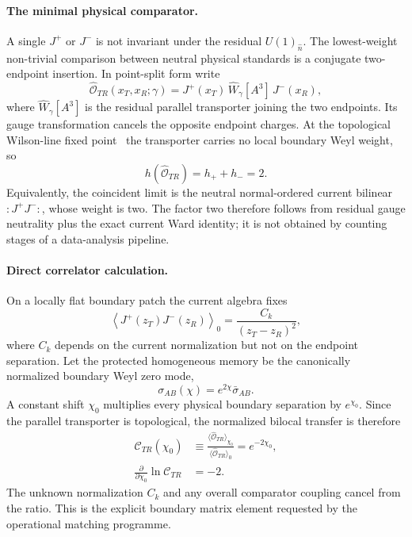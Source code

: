 \documentclass[aps,prd,twocolumn,10pt,superscriptaddress,nofootinbib]{revtex4-2}
\begin{document}
\paragraph{The minimal physical comparator.}
A single $J^+$ or $J^-$ is not invariant under the residual
$U(1)_{\hat n}$.  The lowest-weight non-trivial comparison between neutral
physical standards is a conjugate two-endpoint insertion.  In point-split
form write
\begin{equation}
 \widehat{\mathcal O}_{TR}(x_T,x_R;\gamma)
 =J^+(x_T)\,\widehat W_\gamma[A^3] \,J^-(x_R),
\label{eq:micro2_bilocal}
\end{equation}
where $\widehat W_\gamma[A^3]$ is the residual parallel transporter joining
the two endpoints.  Its gauge transformation cancels the opposite endpoint
charges.  At the topological Wilson-line fixed point~\cite{Gawedzki2004,BachasGaberdiel2004} the transporter carries
no local boundary Weyl weight, so
\begin{equation}
 h(\widehat{\mathcal O}_{TR})=h_++h_-=2.
\label{eq:micro2_total_weight}
\end{equation}
Equivalently, the coincident limit is the neutral normal-ordered current
bilinear $:J^+J^-:$, whose weight is two.  The factor two therefore follows
from residual gauge neutrality plus the exact current Ward identity; it is
not obtained by counting stages of a data-analysis pipeline.

\paragraph{Direct correlator calculation.}
On a locally flat boundary patch the current algebra fixes
\begin{equation}
 \left\langle J^+(z_T)J^-(z_R)\right\rangle_0
 =\frac{C_k}{(z_T-z_R)^2},
\label{eq:micro2_current_correlator}
\end{equation}
where $C_k$ depends on the current normalization but not on the endpoint
separation.  Let the protected homogeneous memory be the canonically
normalized boundary Weyl zero mode,
\begin{equation}
 \sigma_{AB}(\chi)=e^{2\chi}\bar\sigma_{AB}.
\label{eq:micro2_memory_metric}
\end{equation}
A constant shift $\chi_0$ multiplies every physical boundary separation by
$e^{\chi_0}$.  Since the parallel transporter is topological, the normalized
bilocal transfer is therefore
\begin{align}
 \mathcal C_{TR}(\chi_0)
 &\equiv
 \frac{\langle\widehat{\mathcal O}_{TR}\rangle_{\chi_0}}
      {\langle\widehat{\mathcal O}_{TR}\rangle_{0}}
 =e^{-2\chi_0},
\label{eq:micro2_bilocal_response}\\
 \frac{\partial}{\partial\chi_0}\ln\mathcal C_{TR}
 &=-2.
\label{eq:micro2_bilocal_derivative}
\end{align}
The unknown normalization $C_k$ and any overall comparator coupling cancel
from the ratio.  This is the explicit boundary matrix element requested by
the operational matching programme.
\end{document}

